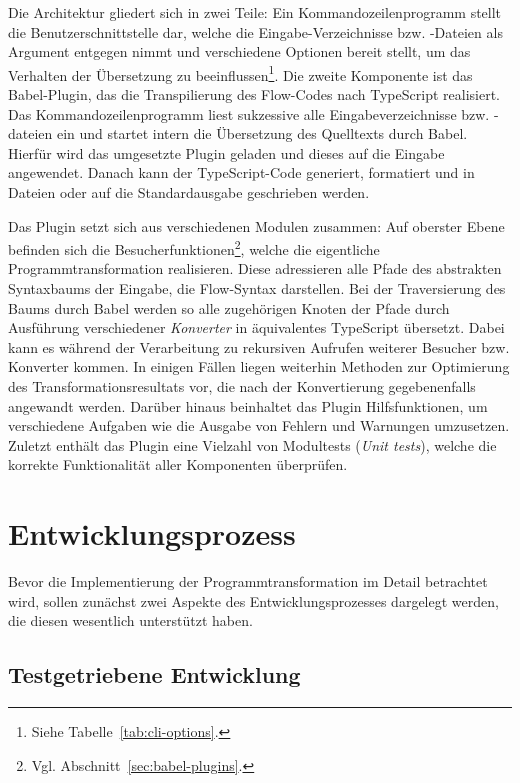 Die Architektur gliedert sich in zwei Teile: Ein Kommandozeilenprogramm stellt die Benutzerschnittstelle dar, welche die Eingabe-Verzeichnisse bzw. -Dateien als Argument entgegen nimmt und verschiedene Optionen bereit stellt, um das Verhalten der Übersetzung zu beeinflussen\footnote{Siehe Tabelle~\ref{tab:cli-options}.}. Die zweite Komponente ist das Babel-Plugin, das die Transpilierung des Flow-Codes nach TypeScript realisiert. Das Kommandozeilenprogramm liest sukzessive alle Eingabeverzeichnisse bzw. -dateien ein und startet intern die Übersetzung des Quelltexts durch Babel. Hierfür wird das umgesetzte Plugin geladen und dieses auf die Eingabe angewendet. Danach kann der TypeScript-Code generiert, formatiert und in Dateien oder auf die Standardausgabe geschrieben werden.

Das Plugin setzt sich aus verschiedenen Modulen zusammen: Auf oberster Ebene befinden sich die Besucherfunktionen\footnote{Vgl. Abschnitt~\ref{sec:babel-plugins}.}, welche die eigentliche Programmtransformation realisieren. Diese adressieren alle Pfade des abstrakten Syntaxbaums der Eingabe, die Flow-Syntax darstellen. Bei der Traversierung des Baums durch Babel werden so alle zugehörigen Knoten der Pfade durch Ausführung verschiedener \emph{Konverter} in äquivalentes TypeScript übersetzt. Dabei kann es während der Verarbeitung zu rekursiven Aufrufen weiterer Besucher bzw. Konverter kommen. In einigen Fällen liegen weiterhin Methoden zur Optimierung des Transformationsresultats vor, die nach der Konvertierung gegebenenfalls angewandt werden. Darüber hinaus beinhaltet das Plugin Hilfsfunktionen, um verschiedene Aufgaben wie die Ausgabe von Fehlern und Warnungen umzusetzen. Zuletzt enthält das Plugin eine Vielzahl von Modultests (\textit{Unit tests}), welche die korrekte Funktionalität aller Komponenten überprüfen.

\section{Entwicklungsprozess}

Bevor die Implementierung der Programmtransformation im Detail betrachtet wird, sollen zunächst zwei Aspekte des Entwicklungsprozesses dargelegt werden, die diesen wesentlich unterstützt haben.

\subsection{Testgetriebene Entwicklung}
\label{sec:tdd}

